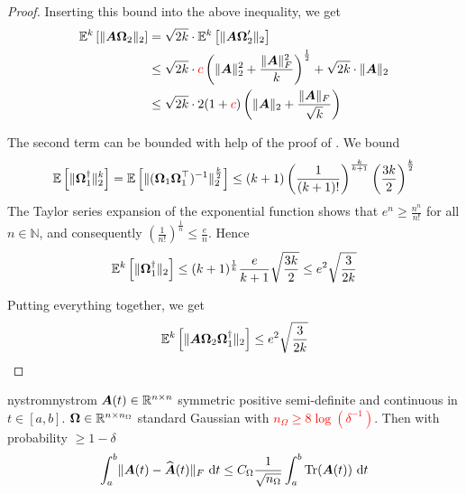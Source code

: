 \documentclass[12pt]{article}
\begin{document}
\begin{proof}
Inserting this bound into the above inequality, we get
\begin{align}
    \mathbb{E}^{k}\left[ \lVert \boldsymbol{A} \boldsymbol{\Omega}_2 \rVert _2 \right]
    &= \sqrt{2k} \cdot \mathbb{E}^{k}\left[ \lVert \boldsymbol{A} \boldsymbol{\Omega}_2' \rVert _2 \right] \notag \\
    &\leq \sqrt{2k} \cdot {{\color{red}c}} \left( \lVert \boldsymbol{A} \rVert _2^2  + \frac{\lVert \boldsymbol{A} \rVert _F^2}{k} \right)^{\frac{1}{2}} + \sqrt{2k} \cdot \lVert \boldsymbol{A} \rVert _2 \notag \\
    &\leq \sqrt{2k} \cdot 2 (1 + {{\color{red}c}})\left( \lVert \boldsymbol{A} \rVert _2  + \frac{\lVert \boldsymbol{A} \rVert _F}{\sqrt{k}} \right)
\end{align}

The second term can be bounded with help of the proof of \cite[Lemma B.3]{tropp-2023-randomized-algorithms}. We bound 
\begin{equation}
    \mathbb{E}\left[ \lVert \boldsymbol{\Omega}_1^{\dagger} \rVert _2^{k} \right]
    = \mathbb{E}\left[ \lVert ( \boldsymbol{\Omega}_1 \boldsymbol{\Omega}_1^{\top} )^{-1} \rVert _2^{\frac{k}{2}} \right]
    \leq \left( k + 1 \right) \left( \frac{1}{(k + 1)!}\right)^{\frac{k}{k + 1}} \left( \frac{3 k}{2}\right)^{\frac{k}{2}}
\end{equation}
The Taylor series expansion of the exponential function shows that $e^n \geq \frac{n^n}{n!}$ for all $n \in \mathbb{N}$, and consequently $\left( \frac{1}{n!} \right)^{\frac{1}{n}} \leq \frac{e}{n}$. Hence
\begin{equation}
    \mathbb{E}^{k}\left[ \lVert \boldsymbol{\Omega}_1^{\dagger} \rVert _2 \right]
    \leq (k+1)^{\frac{1}{k}} \frac{e}{k + 1}\sqrt{ \frac{3k}{2} }
    \leq e^2 \sqrt{\frac{3}{2k}}
\end{equation}

Putting everything together, we get
\begin{equation}
    \mathbb{E}^{k}\left[ \lVert \boldsymbol{A} \boldsymbol{\Omega}_2 \boldsymbol{\Omega}_1^{\dagger} \rVert _2 \right]
    \leq e^2\sqrt{\frac{3}{2k}}
\end{equation}

\end{proof}

\begin{theorem}{nystrom}{nystrom}
    $\boldsymbol{A}(t) \in \mathbb{R}^{n \times n}$ symmetric positive semi-definite and continuous in $t \in [a, b]$. $\boldsymbol{\Omega} \in \mathbb{R}^{n \times n_{\Omega}}$ standard Gaussian with \textcolor{red}{$n_{\Omega} \geq 8 \log(\delta^{-1})$}. Then with probability $\geq 1 - \delta$
    \begin{equation}
        \int_{a}^{b} \lVert \boldsymbol{A}(t) - \widehat{\boldsymbol{A}}(t) \rVert _F ~\mathrm{d}t
        \leq C_{\Omega}\frac{1}{\sqrt{n_{\Omega}}} \int_{a}^{b} \operatorname{Tr}(\boldsymbol{A}(t)) ~\mathrm{d}t 
    \end{equation}
\end{theorem}
\end{document}
